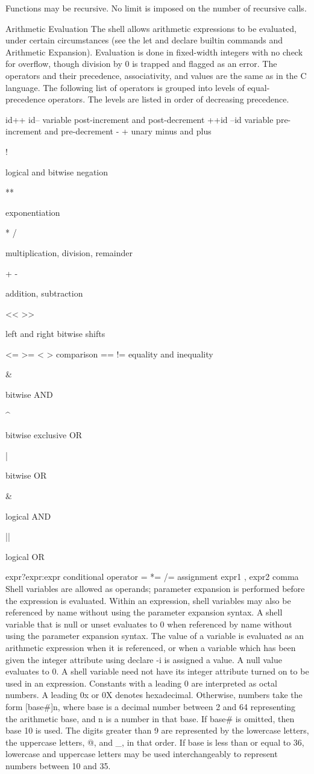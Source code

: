 \documentclass[11pt]{article}
\begin{document}
{{{Functions may be recursive. No limit is imposed on the number of recursive calls.

Arithmetic Evaluation
The shell allows arithmetic expressions to be evaluated, under certain circumstances (see the let and declare builtin commands and Arithmetic Expansion). Evaluation is done in fixed-width integers with no check for overflow, though division by 0 is trapped and flagged as an error. The operators and their precedence, associativity, and values are the same as in the C language. The following list of operators is grouped into levels of equal-precedence operators. The levels are listed in order of decreasing precedence.

id++ id--
variable post-increment and post-decrement
++id --id
variable pre-increment and pre-decrement
- +
unary minus and plus

! ~

logical and bitwise negation

**

exponentiation

* / %

multiplication, division, remainder

+ -

addition, subtraction

<< >>

left and right bitwise shifts

<= >= < >
comparison
== !=
equality and inequality

&

bitwise AND

^

bitwise exclusive OR

|

bitwise OR

\&

logical AND

||

logical OR

expr?expr:expr
conditional operator
= *= /= %
assignment
expr1 , expr2
comma
Shell variables are allowed as operands; parameter expansion is performed before the expression is evaluated. Within an expression, shell variables may also be referenced by name without using the parameter expansion syntax. A shell variable that is null or unset evaluates to 0 when referenced by name without using the parameter expansion syntax. The value of a variable is evaluated as an arithmetic expression when it is referenced, or when a variable which has been given the integer attribute using declare -i is assigned a value. A null value evaluates to 0. A shell variable need not have its integer attribute turned on to be used in an expression.
Constants with a leading 0 are interpreted as octal numbers. A leading 0x or 0X denotes hexadecimal. Otherwise, numbers take the form [base#]n, where base is a decimal number between 2 and 64 representing the arithmetic base, and n is a number in that base. If base# is omitted, then base 10 is used. The digits greater than 9 are represented by the lowercase letters, the uppercase letters, @, and _, in that order. If base is less than or equal to 36, lowercase and uppercase letters may be used interchangeably to represent numbers between 10 and 35.

}}}
\end{document}
